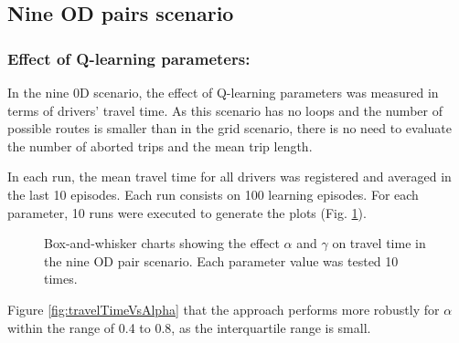 \documentclass{RITA}
\begin{document}
\subsection{Nine OD pairs scenario}

\subsubsection{Effect of Q-learning parameters:}
\label{sec:qlParamsNineOD}
In the nine 0D scenario, the effect of Q-learning parameters was measured in terms of drivers' travel time. As this scenario has no loops and the number of possible routes is smaller than in the grid scenario, there is no need to evaluate the number of aborted trips and the mean trip length.

In each run, the mean travel time for all drivers was registered and averaged in the last 10 episodes. Each run consists on 100 learning episodes. For each parameter, 10 runs were executed to generate the plots (Fig. \ref{fig:qLearningParams}).

\begin{figure}[ht]
  \centering
  \caption{Box-and-whisker charts showing the effect $\alpha$ and $\gamma$ on travel time in the nine OD pair scenario. Each parameter value was tested 10 times.}
  \label{fig:qLearningParams}
\end{figure}

Figure \ref{fig:travelTimeVsAlpha} that the approach performs more robustly for $\alpha$ within the range of 0.4 to 0.8, as the interquartile range is small.%
\end{document}
